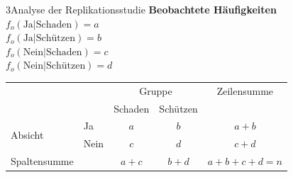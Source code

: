 \documentclass[xcolor=table,9pt,aspectratio=169]{beamer}
\begin{document}
\begin{frame}{\vspace*{10mm}3\hspace*{1em}Analyse der Replikationsstudie}
\textbf{Beobachtete Häufigkeiten}\\
\smallskip
$f_{o}(\text{Ja}|\text{Schaden})=a$\\
$f_{o}(\text{Ja}|\text{Schützen})=b$\\
$f_{o}(\text{Nein}|\text{Schaden})=c$\\
$f_{o}(\text{Nein}|\text{Schützen})=d$\\

\bigskip
\begin{tabular}{llccc}
   \arrayrulecolor{blue2}\hline
                              &        & \multicolumn{2}{c}{Gruppe}   & Zeilensumme   \\
                              &        & Schaden   & Schützen         &               \\
   \hline
   \multirow{2}{*}{Absicht}   & Ja     & $a$       & $b$              & $a+b$         \\
                              & Nein   & $c$       & $d$              & $c+d$         \\
   \hline
   Spaltensumme               &        & $a+c$     & $b+d$            & $a+b+c+d=n$   \\
   \hline
\end{tabular}
\end{frame}
\end{document}
